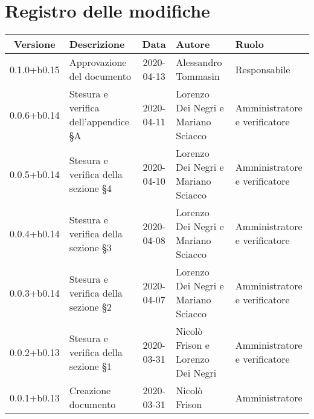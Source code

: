 \section*{Registro delle modifiche}

\begin{center}
	\begin{longtable}{|c|p{3.5cm}|c|p{3cm}|p{3cm}|}
	\hline
	\rowcolor{lighter-grayer}
	\textbf{Versione} & \textbf{Descrizione} & \textbf{Data} & \textbf{Autore} & \textbf{Ruolo} \\
	\hline
	\endfirsthead
	
	0.1.0+b0.15 & Approvazione del documento & 2020-04-13 & Alessandro Tommasin & Responsabile \\
	\hline
	0.0.6+b0.14 & Stesura e verifica dell'appendice \S A & 2020-04-11 & Lorenzo Dei Negri e Mariano Sciacco & Amministratore e verificatore \\
	\hline
	0.0.5+b0.14 & Stesura e verifica della sezione \S4 & 2020-04-10 & Lorenzo Dei Negri e Mariano Sciacco & Amministratore e verificatore \\
	\hline
	0.0.4+b0.14 & Stesura e verifica della sezione \S3 & 2020-04-08 & Lorenzo Dei Negri e Mariano Sciacco & Amministratore e verificatore \\
	\hline
	0.0.3+b0.14 & Stesura e verifica della sezione \S2 & 2020-04-07 & Lorenzo Dei Negri e Mariano Sciacco & Amministratore e verificatore \\
	\hline
	0.0.2+b0.13 & Stesura e verifica della sezione \S1 & 2020-03-31 & Nicolò Frison e Lorenzo Dei Negri & Amministratore e verificatore \\
	\hline
	0.0.1+b0.13 & Creazione documento & 2020-03-31 & Nicolò Frison & Amministratore \\
	\hline
	\hline
	\end{longtable}
\end{center}